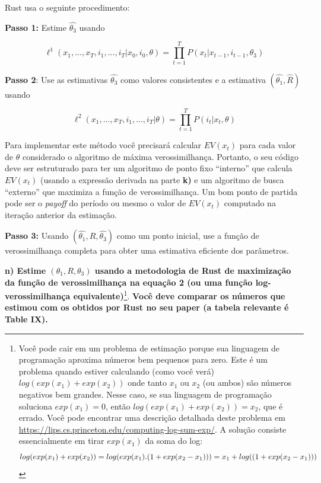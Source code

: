\documentclass[12pt,a4paper]{article}
\let\rmarkdownfootnote\footnote%
\def\footnote{\protect\rmarkdownfootnote}
\begin{document}
Rust usa o seguinte procedimento:

\textbf{Passo 1:} Estime \(\hat{\theta_3}\) usando

\[
\ell^1 (x_1,...,x_T,i_1,...,i_T|x_0,i_0,\theta) = \prod_{t=1}^T P(x_t|x_{t-1},i_{t-1},\theta_3)
\]

\textbf{Passo 2}: Use as estimativas \(\hat{\theta_3}\) como valores
consistentes e a estimativa \((\hat{\theta_1},\hat{R})\) usando

\[
\ell^2 (x_1,...,x_T,i_1,...,i_T|\theta)= \prod_{t=1}^T P(i_t|x_t,\theta)
\]

Para implementar este método você precisará calcular \(EV(x_t)\) para
cada valor de \(\theta\) considerado o algoritmo de máxima
verossimilhança. Portanto, o seu código deve ser estruturado para ter um
algoritmo de ponto fixo ``interno'' que calcula \(EV(x_t)\) (usando a
expressão derivada na parte \textbf{k)} e um algoritmo de busca
``externo'' que maximiza a função de verossimilhança. Um bom ponto de
partida pode ser o \emph{payoff} do período ou mesmo o valor de
\(EV(x_t)\) computado na iteração anterior da estimação.

\textbf{Passo 3:} Usando \((\hat{\theta_1},\hat{R},\hat{\theta_3})\)
como um ponto inicial, use a função de verossimilhança completa para
obter uma estimativa eficiente dos parâmetros.

\textbf{n) Estime \((\theta_1, R,\theta_3)\) usando a metodologia de
Rust de maximização da função de verossimilhança na equação 2 (ou uma
função log-verossimilhança equivalente)}\footnote{Você pode cair em um
  problema de estimação porque sua linguagem de programação aproxima
  números bem pequenos para zero. Este é um problema quando estiver
  calculando (como você verá) \(log(exp(x_1) + exp(x_2))\) onde tanto
  \(x_1\) ou \(x_2\) (ou ambos) são números negativos bem grandes. Nesse
  caso, se sua linguagem de programação soluciona \(exp(x_1)= 0\), então
  \(log(exp(x_1) + exp(x_2))=x_2\), que é errado. Você pode encontrar
  uma descrição detalhada deste problema em
  \url{https://lips.cs.princeton.edu/computing-log-sum-exp/}. A solução
  consiste essencialmente em tirar \(exp (x_1)\) da soma do log: \[
  log(exp(x_1) + exp(x_2))= log (exp(x_1).(1 + exp (x_2 - x_1))) \\
  = x_1 + log((1+exp(x_2-x_1)))
  \]}. \textbf{Você deve comparar os números que estimou com os obtidos
por Rust no seu paper (a tabela relevante é Table IX).}
\end{document}
